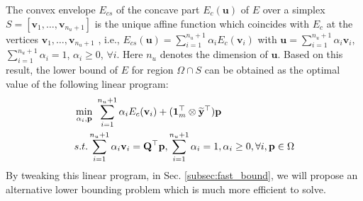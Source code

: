 \documentclass[11pt,bezier,]{article}
\begin{document}
The convex envelope $E_{cs}$ of the concave part $E_c(\mathbf u)$ of  $E$ 
over a simplex $S=[\mathbf v_1,\ldots,\mathbf v_{n_u +1}]$ is
the unique affine function which coincides with $E_c$ 
at the vertices $\mathbf v_1,\ldots,\mathbf v_{n_u+1}$  \cite{book_concave},
i.e.,
$
E_{cs}(\mathbf u)= \sum_{i=1}^{n_u+1} \alpha_i E_c(\mathbf v_i) 
$
with 
$\mathbf u=\sum_{i=1}^{n_u+1} \alpha_i \mathbf v_i$,
$\sum_{i=1}^{n_u+1} \alpha_i=1$,
$\alpha_i\ge 0$,
$\forall i$.
Here $n_u$ denotes the dimension of $\mathbf u$.
Based on this result,
the lower bound of $E$ for region $\Omega\cap S$ can be obtained as the optimal value of  the following linear program:
\begin{align}
& \min_{\alpha_i,\mathbf p}\  \sum_{i=1}^{n_u+1} \alpha_i E_c(\mathbf v_i) 
 +(\mathbf 1_m^\top\otimes\mathbf{\widetilde y}^\top)\mathbf  p \notag\\
& s.t. \sum_{i=1}^{n_u+1} \alpha_i\mathbf v_i=\mathbf Q^\top\mathbf p,
 \sum_{i=1}^{n_u+1} \alpha_i=1,\alpha_i\ge 0,\forall i,\mathbf p\in \Omega \label{lower_bound_prob}
\end{align}
By tweaking this linear program, 
in Sec. \ref{subsec:fast_bound},
we will propose an alternative lower bounding problem  
which is much more efficient to solve.
 
\end{document}

